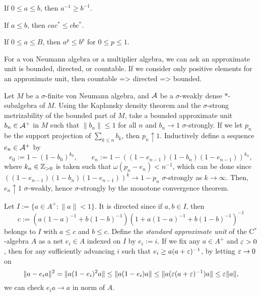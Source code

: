 \documentclass{../../large}
\begin{document}



\begin{prb}
\begin{parts}
\item If $0\le a\le b$, then $a^{-1}\ge b^{-1}$.
\item If $a\le b$, then $cac^*\le cbc^*$.
\item If $0\le a\le B$, then $a^p\le b^p$ for $0\le p\le1$.
\end{parts}
\end{prb}





\begin{prb}
For a von Neumann algebra or a multiplier algebra, we can ask an approximate unit is bounded, directed, or countable.
If we consider only positive elements for an approximate unit, then countable => directed => bounded.



Let $M$ be a $\sigma$-finite von Neumann algebra, and $\mathcal{A}$ be a $\sigma$-weakly dense $*$-subalgebra of $M$.
Using the Kaplansky density theorem and the $\sigma$-strong metrizability of the bounded part of $M$, take a bounded approximate unit $b_n\in\mathcal{A}^+$ in $M$ such that $\|b_n\|\le1$ for all $n$ and $b_n\to1$ $\sigma$-strongly.
If we let $p_n$ be the support projection of $\sum_{k\le n}b_k$, then $p_n\uparrow1$.
Inductively define a sequence $e_n\in\mathcal{A}^+$ by
\[e_0:=1-(1-b_0)^{k_0},\qquad e_n:=1-((1-e_{n-1})(1-b_n)(1-e_{n-1}))^{k_n},\]
where $k_n\in\mathbb{Z}_{>0}$ is taken such that $\omega(p_n-e_n)<n^{-1}$, which can be done since $((1-e_{n-1})(1-b_n)(1-e_{n-1}))^k\to1-p_n$ $\sigma$-strongly as $k\to\infty$.
Then, $e_n\uparrow1$ $\sigma$-weakly, hence $\sigma$-strongly by the monotone convergence theorem.




Let $I:=\{a\in A^+:\|a\|<1\}$.
It is directed since if $a,b\in I$, then
\[c:=(a(1-a)^{-1}+b(1-b)^{-1})(1+a(1-a)^{-1}+b(1-b)^{-1})^{-1}\]
belongs to $I$ with $a\le c$ and $b\le c$.
Define the \emph{standard approximate unit} of the C$^*$-algebra $A$ as a net $e_i\in A$ indexed on $I$ by $e_i:=i$.
If we fix any $a\in A^+$ and $\varepsilon>0$, then for any sufficiently advancing $i$ such that $e_i\ge a(a+\varepsilon)^{-1}$, by letting $\varepsilon\to0$ on
\[\|a-e_ia\|^2=\|a(1-e_i)^2a\|\le\|a(1-e_i)a\|\le\|a(\varepsilon(a+\varepsilon)^{-1})a\|\le\varepsilon\|a\|,\]
we can check $e_ia\to a$ in norm of $A$.

\begin{parts}
\item
\end{parts}
\end{prb}
\end{document}
